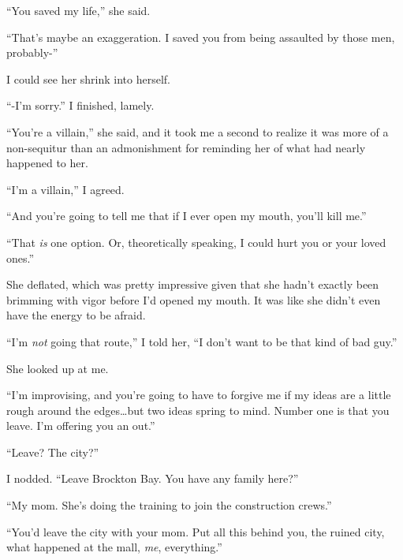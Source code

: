 ``You saved my life,'' she said.



``That's maybe an exaggeration.  I saved you from being assaulted by those men, probably-''



I could see her shrink into herself.



``-I'm sorry.''  I finished, lamely.



``You're a villain,'' she said, and it took me a second to realize it was more of a non-sequitur than an admonishment for reminding her of what had nearly happened to her.



``I'm a villain,'' I agreed.



``And you're going to tell me that if I ever open my mouth, you'll kill me.''



``That \emph{is} one option.  Or, theoretically speaking, I could hurt you or your loved ones.''



She deflated, which was pretty impressive given that she hadn't exactly been brimming with vigor before I'd opened my mouth.  It was like she didn't even have the energy to be afraid.



``I'm \emph{not} going that route,'' I told her, ``I don't want to be that kind of bad guy.''



She looked up at me.



``I'm improvising, and you're going to have to forgive me if my ideas are a little rough around the edges\ldots but two ideas spring to mind.  Number one is that you leave.  I'm offering you an out.''



``Leave?  The city?''



I nodded.  ``Leave Brockton Bay.  You have any family here?''



``My mom.  She's doing the training to join the construction crews.''



``You'd leave the city with your mom.  Put all this behind you, the ruined city, what happened at the mall, \emph{me}, everything.''



